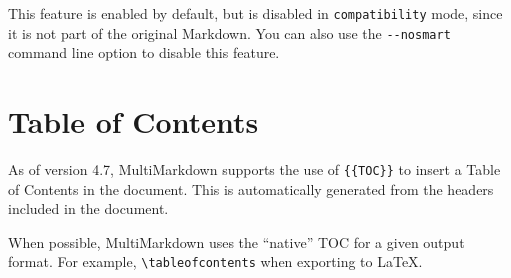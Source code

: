 This feature is enabled by default, but is disabled in \texttt{compatibility} mode, since it is not part of the original Markdown. You can also use the \texttt{-{}-nosmart} command line option to disable this feature.

\section{Table of Contents }
\label{tableofcontents}

As of version 4.7, MultiMarkdown supports the use of \texttt{\{\{TOC\}\}} to insert a Table of Contents in the document. This is automatically generated from the headers included in the document.

When possible, MultiMarkdown uses the ``native'' TOC for a given output format. For example, \texttt{\textbackslash{}tableofcontents} when exporting to LaTeX.



